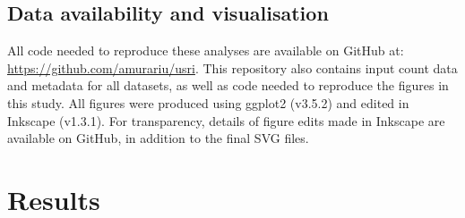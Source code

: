 \documentclass[10pt,letterpaper]{article}
\newlength\savedwidth
\newcommand\thickhline{\noalign{\global\savedwidth\arrayrulewidth\global\arrayrulewidth 2pt}%
\hline
\noalign{\global\arrayrulewidth\savedwidth}}
\begin{document}
\subsection*{Data availability and visualisation}
All code needed to reproduce these analyses are available on GitHub at: \url{https://github.com/amurariu/usri}. This repository also contains input count data and metadata for all datasets, as well as code needed to reproduce the figures in this study. All figures were produced using ggplot2 (v3.5.2) \cite{wickham_ggplot_2016} and edited in Inkscape (v1.3.1). For transparency, details of figure edits made in Inkscape are available on GitHub, in addition to the final SVG files.





\section*{Results}

\end{document}
